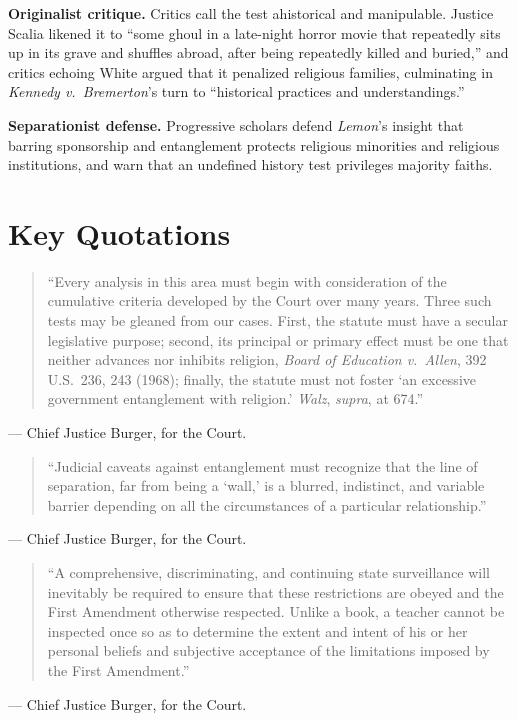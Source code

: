 \documentclass[12pt]{article}
\begin{document}
\textbf{Originalist critique.} Critics call the test ahistorical and manipulable. Justice Scalia likened it to ``some ghoul in a late-night horror movie that repeatedly sits up in its grave and shuffles abroad, after being repeatedly killed and buried,'' and critics echoing White argued that it penalized religious families, culminating in \textit{Kennedy v.\ Bremerton}'s turn to ``historical practices and understandings.''

\textbf{Separationist defense.} Progressive scholars defend \textit{Lemon}'s insight that barring sponsorship and entanglement protects religious minorities and religious institutions, and warn that an undefined history test privileges majority faiths.

\section{Key Quotations}

\begin{quote}\sloppy
``Every analysis in this area must begin with consideration of the cumulative criteria developed by the Court over many years. Three such tests may be gleaned from our cases. First, the statute must have a secular legislative purpose; second, its principal or primary effect must be one that neither advances nor inhibits religion, \textit{Board of Education v.\ Allen}, 392 U.S.\ 236, 243 (1968); finally, the statute must not foster `an excessive government entanglement with religion.' \textit{Walz}, \textit{supra}, at 674.''
\end{quote}
\noindent --- Chief Justice Burger, for the Court.

\begin{quote}
``Judicial caveats against entanglement must recognize that the line of separation, far from being a `wall,' is a blurred, indistinct, and variable barrier depending on all the circumstances of a particular relationship.''
\end{quote}
\noindent --- Chief Justice Burger, for the Court.

\begin{quote}\sloppy
``A comprehensive, discriminating, and continuing state surveillance will inevitably be required to ensure that these restrictions are obeyed and the First Amendment otherwise respected. Unlike a book, a teacher cannot be inspected once so as to determine the extent and intent of his or her personal beliefs and subjective acceptance of the limitations imposed by the First Amendment.''
\end{quote}
\noindent --- Chief Justice Burger, for the Court.
\end{document}
